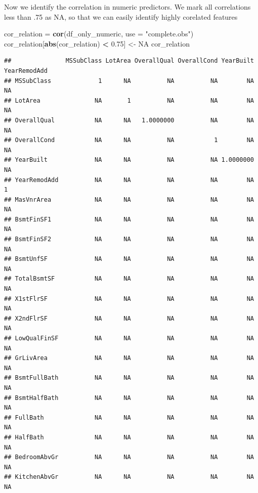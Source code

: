 \documentclass[
]{article}
\newenvironment{Shaded}{\begin{snugshade}}{\end{snugshade}}
\newcommand{\DataTypeTok}[1]{\textcolor[rgb]{0.13,0.29,0.53}{#1}}
\newcommand{\FloatTok}[1]{\textcolor[rgb]{0.00,0.00,0.81}{#1}}
\newcommand{\KeywordTok}[1]{\textcolor[rgb]{0.13,0.29,0.53}{\textbf{#1}}}
\newcommand{\NormalTok}[1]{#1}
\newcommand{\OperatorTok}[1]{\textcolor[rgb]{0.81,0.36,0.00}{\textbf{#1}}}
\newcommand{\OtherTok}[1]{\textcolor[rgb]{0.56,0.35,0.01}{#1}}
\newcommand{\StringTok}[1]{\textcolor[rgb]{0.31,0.60,0.02}{#1}}
\begin{document}
Now we identify the correlation in numeric predictors. We mark all correlations less than .75 as NA, so that we can easily identify highly corelated features

\begin{Shaded}
\begin{Highlighting}[]
\NormalTok{cor_relation =}\StringTok{ }\KeywordTok{cor}\NormalTok{(df_only_numeric, }\DataTypeTok{use =} \StringTok{"complete.obs"}\NormalTok{)}
\NormalTok{cor_relation[}\KeywordTok{abs}\NormalTok{(cor_relation) }\OperatorTok{<}\StringTok{ }\FloatTok{0.75}\NormalTok{] <-}\StringTok{ }\OtherTok{NA}
\NormalTok{cor_relation}
\end{Highlighting}
\end{Shaded}

\begin{verbatim}
##               MSSubClass LotArea OverallQual OverallCond YearBuilt YearRemodAdd
## MSSubClass             1      NA          NA          NA        NA           NA
## LotArea               NA       1          NA          NA        NA           NA
## OverallQual           NA      NA   1.0000000          NA        NA           NA
## OverallCond           NA      NA          NA           1        NA           NA
## YearBuilt             NA      NA          NA          NA 1.0000000           NA
## YearRemodAdd          NA      NA          NA          NA        NA            1
## MasVnrArea            NA      NA          NA          NA        NA           NA
## BsmtFinSF1            NA      NA          NA          NA        NA           NA
## BsmtFinSF2            NA      NA          NA          NA        NA           NA
## BsmtUnfSF             NA      NA          NA          NA        NA           NA
## TotalBsmtSF           NA      NA          NA          NA        NA           NA
## X1stFlrSF             NA      NA          NA          NA        NA           NA
## X2ndFlrSF             NA      NA          NA          NA        NA           NA
## LowQualFinSF          NA      NA          NA          NA        NA           NA
## GrLivArea             NA      NA          NA          NA        NA           NA
## BsmtFullBath          NA      NA          NA          NA        NA           NA
## BsmtHalfBath          NA      NA          NA          NA        NA           NA
## FullBath              NA      NA          NA          NA        NA           NA
## HalfBath              NA      NA          NA          NA        NA           NA
## BedroomAbvGr          NA      NA          NA          NA        NA           NA
## KitchenAbvGr          NA      NA          NA          NA        NA           NA

\end{verbatim}
\end{document}
